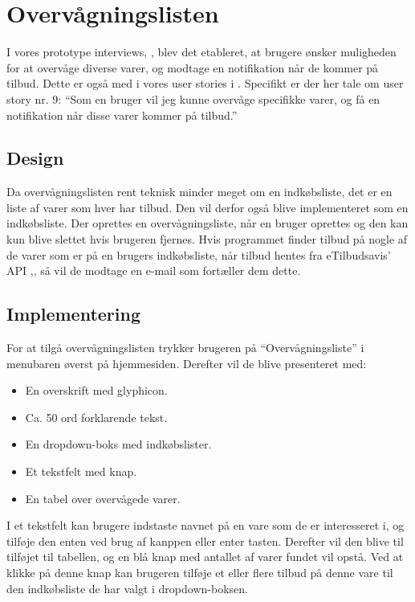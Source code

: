 \section{Overvågningslisten}
I vores prototype interviews, , blev det etableret, at brugere ønsker muligheden for at overvåge diverse varer, og modtage en notifikation når de kommer på tilbud.
Dette er også med i vores user stories i .
Specifikt er der her tale om user story nr. 9: ``Som en bruger vil jeg kunne overvåge specifikke varer, og få en notifikation når disse varer kommer på tilbud.''
\subsection{Design}
Da overvågningslisten rent teknisk minder meget om en indkøbsliste, det er en liste af varer som hver har tilbud.
Den vil derfor også blive implementeret som en indkøbsliste. 
Der oprettes en overvågningsliste, når en bruger oprettes og den kan kun blive slettet hvis brugeren fjernes.
Hvis programmet finder tilbud på nogle af de varer som er på en brugers indkøbsliste, når tilbud hentes fra eTilbudsavis' API ,, så vil de modtage en e-mail som fortæller dem dette. 
\subsection{Implementering} 
For at tilgå overvågningslisten trykker brugeren på ``Overvågningsliste'' i menubaren øverst på hjemmesiden.
Derefter vil de blive presenteret med:
\begin{itemize} 
	\item En overskrift med glyphicon.
	\item Ca. 50 ord forklarende tekst.
	\item En dropdown-boks med indkøbslister.
	\item Et tekstfelt med knap.
	\item En tabel over overvågede varer.
\end{itemize}
I et tekstfelt kan brugere indstaste navnet på en vare som de er interesseret i, og tilføje den enten ved brug af kanppen eller enter tasten.
Derefter vil den blive til tilføjet til tabellen, og en blå knap med antallet af varer fundet vil opstå.
Ved at klikke på denne knap kan brugeren tilføje et eller flere tilbud på denne vare til den indkøbsliste de har valgt i dropdown-boksen.

